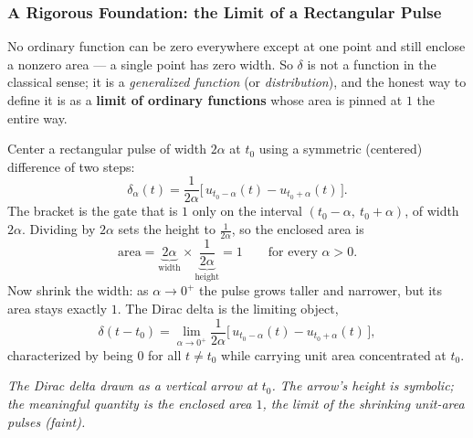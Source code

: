 \documentclass[11pt]{article}
\begin{document}
\subsubsection*{A Rigorous Foundation: the Limit of a Rectangular Pulse}

No ordinary function can be zero everywhere except at one point and still enclose a nonzero area --- a single point has zero width. So $\delta$ is not a function in the classical sense; it is a \emph{generalized function} (or \emph{distribution}), and the honest way to define it is as a \textbf{limit of ordinary functions} whose area is pinned at $1$ the entire way.

Center a rectangular pulse of width $2\alpha$ at $t_0$ using a symmetric (centered) difference of two steps:
\[ \delta_\alpha(t) = \frac{1}{2\alpha}\big[\,u_{t_0 - \alpha}(t) - u_{t_0 + \alpha}(t)\,\big]. \]
The bracket is the gate that is $1$ only on the interval $(t_0 - \alpha,\ t_0 + \alpha)$, of width $2\alpha$. Dividing by $2\alpha$ sets the height to $\tfrac{1}{2\alpha}$, so the enclosed area is
\[ \text{area} = \underbrace{2\alpha}_{\text{width}} \times \underbrace{\frac{1}{2\alpha}}_{\text{height}} = 1 \qquad\text{for every } \alpha > 0. \]
Now shrink the width: as $\alpha \to 0^{+}$ the pulse grows taller and narrower, but its area stays exactly $1$. The Dirac delta is the limiting object,
\[ \delta(t - t_0) = \lim_{\alpha \to 0^{+}} \frac{1}{2\alpha}\big[\,u_{t_0 - \alpha}(t) - u_{t_0 + \alpha}(t)\,\big], \]
characterized by being $0$ for all $t \ne t_0$ while carrying unit area concentrated at $t_0$.

\begin{center}
\end{center}
\begin{center}
\small\itshape The Dirac delta drawn as a vertical arrow at $t_0$. The arrow's \emph{height} is symbolic; the meaningful quantity is the enclosed \emph{area} $1$, the limit of the shrinking unit-area pulses (faint).
\end{center}
\end{document}
